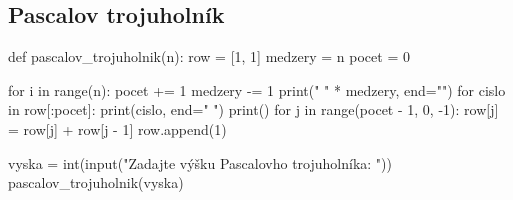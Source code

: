 \subsection{Pascalov trojuholník}
\begin{solution}
def pascalov_trojuholnik(n):
    row = [1, 1]
    medzery = n
    pocet = 0

    for i in range(n):
        pocet += 1
        medzery -= 1
        print(" " * medzery, end="")
        for cislo in row[:pocet]:
            print(cislo, end=" ")
        print()
        for j in range(pocet - 1,  0, -1):
            row[j] = row[j] + row[j - 1]
        row.append(1)

vyska = int(input("Zadajte výšku Pascalovho trojuholníka: "))
pascalov_trojuholnik(vyska)
\end{solution}

